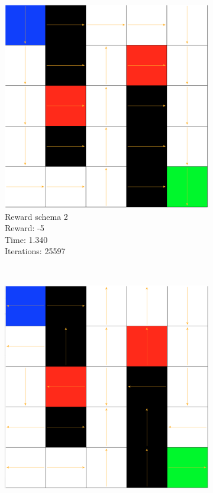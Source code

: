 \documentclass[a4paper,10pt]{article}
\begin{document}
\begin{figure}[H]
\begin{subfigure}[b]{0.3\textwidth}
                \includegraphics[width=\textwidth]{figures/5x5_qlearn_r2.png}
                \caption{Reward schema 2\\
                Reward: -5\\
                Time:  1.340\\
                Iterations: 25597 }
                \label{fig:q2}
        \end{subfigure}
        ~ %
        \begin{subfigure}[b]{0.3\textwidth}
                \includegraphics[width=\textwidth]{figures/5x5_qlearn_r3.png}

\end{subfigure}
\end{figure}
\end{document}
